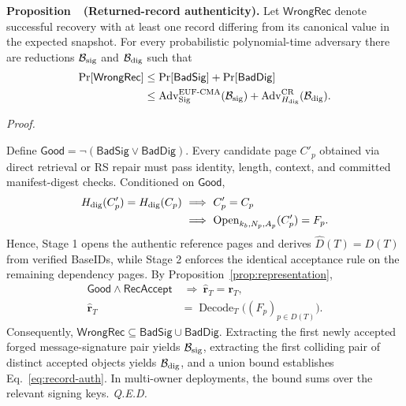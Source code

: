 \documentclass[10pt,journal]{IEEEtran}
\newcounter{proposition}
\newenvironment{proposition}[1]{%
  \refstepcounter{proposition}\par\smallskip\noindent
  \textbf{Proposition~\theproposition\ (#1). }\ignorespaces
}{\par\smallskip}
\newenvironment{claimproof}{\par\noindent\emph{Proof. }\ignorespaces
}{\hfill\textit{Q.E.D.}\par\smallskip}
\begin{document}
\begin{proposition}{Returned-record authenticity}\label{prop:record-auth}
Let $\mathsf{WrongRec}$ denote successful recovery with at least one record differing from its canonical value in the expected snapshot. For every probabilistic polynomial-time adversary there are reductions $\mathcal B_{\rm sig}$ and $\mathcal B_{\rm dig}$ such that
\begin{equation}\label{eq:record-auth}
\begin{aligned}
\Pr[\mathsf{WrongRec}]
&\leq \Pr[\mathsf{BadSig}]+\Pr[\mathsf{BadDig}]\\
&\leq \operatorname{Adv}^{\rm EUF\text{-}CMA}_{\rm Sig}(\mathcal B_{\rm sig})
+\operatorname{Adv}^{\rm CR}_{H_{\rm dig}}(\mathcal B_{\rm dig}).
\end{aligned}
\end{equation}
\end{proposition}
\begin{claimproof}
Define $\mathsf{Good}=\neg(\mathsf{BadSig}\lor\mathsf{BadDig})$. Every candidate page $C'_p$ obtained via direct retrieval or RS repair must pass identity, length, context, and committed manifest-digest checks. Conditioned on $\mathsf{Good}$,
\begin{equation}
\begin{aligned}
H_{\rm dig}(C'_p)=H_{\rm dig}(C_p)&\ \Longrightarrow\ C'_p=C_p\\
&\ \Longrightarrow\ \operatorname{Open}_{k_b,N_p,A_p}(C'_p)=F_p.
\end{aligned}
\end{equation}
Hence, Stage 1 opens the authentic reference pages and derives $\widehat D(T)=D(T)$ from verified BaseIDs, while Stage 2 enforces the identical acceptance rule on the remaining dependency pages. By Proposition~\ref{prop:representation},
\begin{equation}
\begin{aligned}
\mathsf{Good}\land\mathsf{RecAccept}&\ \Longrightarrow\ \widehat{\mathbf r}_T=\mathbf r_T,\\
\widehat{\mathbf r}_T&=\operatorname{Decode}_T\bigl((F_p)_{p\in D(T)}\bigr).
\end{aligned}
\end{equation}
Consequently, $\mathsf{WrongRec}\subseteq\mathsf{BadSig}\cup\mathsf{BadDig}$. Extracting the first newly accepted forged message-signature pair yields $\mathcal B_{\rm sig}$, extracting the first colliding pair of distinct accepted objects yields $\mathcal B_{\rm dig}$, and a union bound establishes Eq.~\eqref{eq:record-auth}. In multi-owner deployments, the bound sums over the relevant signing keys.
\end{claimproof}
\end{document}
